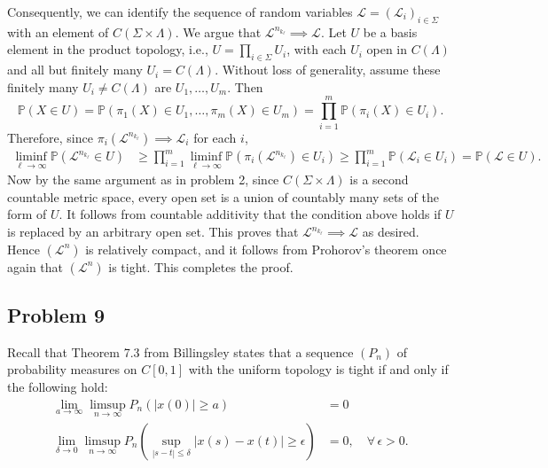 \documentclass[12pt]{article}
\begin{document}
		Consequently, we can identify the sequence of random variables $\mathcal{L} = (\mathcal{L}_i)_{i\in\Sigma}$ with an element of $C(\Sigma\times\Lambda)$. We argue that $\mathcal{L}^{n_{k_\ell}}\implies \mathcal{L}$. Let $U$ be a basis element in the product topology, i.e., $U = \prod_{i\in\Sigma} U_i$, with each $U_i$ open in $C(\Lambda)$ and all but finitely many $U_i = C(\Lambda)$. Without loss of generality, assume these finitely many $U_i\neq C(\Lambda)$ are $U_1,\dots,U_m$. Then
		\[
		\mathbb{P}(X \in U) = \mathbb{P}(\pi_1(X) \in U_1, \dots, \pi_m(X) \in U_m) = \prod_{i=1}^m \mathbb{P}(\pi_i(X)\in U_i).
		\]
		Therefore, since $\pi_i(\mathcal{L}^{n_{k_\ell}}) \implies \mathcal{L}_i$ for each $i$,
		\begin{align*}
		\liminf_{\ell\to\infty} \mathbb{P}(\mathcal{L}^{n_{k_\ell}} \in U) &\geq \prod_{i=1}^m \liminf_{\ell\to\infty} \mathbb{P}(\pi_i(\mathcal{L}^{n_{k_\ell}})\in U_i) \geq \prod_{i=1}^m \mathbb{P}(\mathcal{L}_i \in U_i) = \mathbb{P}(\mathcal{L}\in U).
		\end{align*}
		Now by the same argument as in problem 2, since $C(\Sigma\times\Lambda)$ is a second countable metric space, every open set is a union of countably many sets of the form of $U$. It follows from countable additivity that the condition above holds if $U$ is replaced by an arbitrary open set. This proves that $\mathcal{L}^{n_{k_\ell}} \implies \mathcal{L}$ as desired. Hence $(\mathcal{L}^n)$ is relatively compact, and it follows from Prohorov's theorem  once again that $(\mathcal{L}^n)$ is tight. This completes the proof.
		
	
	\subsection*{Problem 9}
	
		Recall that Theorem 7.3 from Billingsley states that a sequence $(P_n)$ of probability measures on $C[0,1]$ with the uniform topology is tight if and only if the following hold:
		\begin{align}
			\lim_{a\to\infty} \limsup_{n\to\infty} P_n(|x(0)|\geq a) &= 0 \\
			\lim_{\delta\to 0} \limsup_{n\to\infty} P_n\left(\sup_{|s-t|\leq\delta} |x(s)-x(t)| \geq \epsilon\right) &= 0, \quad \forall\,\epsilon>0.
		\end{align}
		
\end{document}
